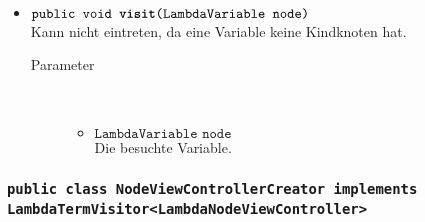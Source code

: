\begin{description}
\begin{itemize}
		\item $\texttt{public void \textbf{visit}(LambdaVariable node)}$ \\ Kann nicht eintreten, da eine Variable keine Kindknoten hat.
		\begin{description}
			\item[Parameter] \hfill \\
			\vspace{-.8cm}
			\begin{itemize}
				\item $\texttt{LambdaVariable node}$ \\ Die besuchte Variable.
			\end{itemize}
		\end{description}
	\end{itemize}
\end{description}

\subsubsection{\normalfont \texttt{public class \textbf{NodeViewControllerCreator} implements LambdaTermVisitor<LambdaNodeViewController>}}

